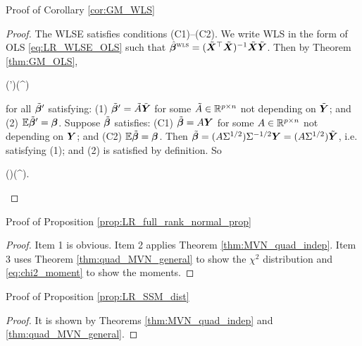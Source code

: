 \documentclass[10pt,a4paper]{book}
\begin{document}
\begin{pfbox}{Proof of Corollary \ref{cor:GM_WLS}}
	\begin{proof}
		The WLSE satisfies conditions (C1)--(C2).
		We write WLS in the form of OLS \eqref{eq:LR_WLSE_OLS} such that $\hat{{\boldsymbol\beta}}^{\textsc{wls}}=(\tilde{{\boldsymbol X}}^\top\tilde{{\boldsymbol X}})^{-1}\tilde{{\boldsymbol X}}\tilde{{\boldsymbol Y}}$. 
		Then by Theorem \ref{thm:GM_OLS}, 
		\begin{sequation*}
			\Cov(\tilde{\bab}')\succeq \Cov(\hat{\bab}^{\WLS})
		\end{sequation*}
		for all $\tilde{{\boldsymbol\beta}}'$ satisfying: (1) $\tilde{{\boldsymbol\beta}}'=\tilde{A}\tilde{{\boldsymbol Y}}$ for some $\tilde{A}\in\mathbb R^{p\times n}$ not depending on $\tilde{{\boldsymbol Y}}$; and (2) $\mathbb E\tilde{{\boldsymbol\beta}}'={\boldsymbol\beta}$.
		Suppose $\tilde{{\boldsymbol\beta}}$ satisfies: (C1) $\tilde{{\boldsymbol\beta}}=A{\boldsymbol Y}$ for some $A\in\mathbb R^{p\times n}$ not depending on ${\boldsymbol Y}$; and (C2) $\mathbb E\tilde{{\boldsymbol\beta}}={\boldsymbol\beta}$.
		Then $\tilde{{\boldsymbol\beta}}=(A\Sigma^{1/2})\Sigma^{-1/2}{\boldsymbol Y}=(A\Sigma^{1/2})\tilde{{\boldsymbol Y}}$, i.e. satisfying (1); and (2) is satisfied by definition. 
		So 
		\begin{sequation*}
			\Cov(\tilde{\bab})\succeq \Cov(\hat{\bab}^{\WLS}).
		\end{sequation*}
	\end{proof}
\end{pfbox}

\begin{pfbox}{Proof of Proposition \ref{prop:LR_full_rank_normal_prop}}
	\begin{proof}
		Item 1 is obvious. Item 2 applies Theorem \ref{thm:MVN_quad_indep}. Item 3 uses Theorem \ref{thm:quad_MVN_general} to show the $\chi^2$ distribution and \eqref{eq:chi2_moment} to show the moments. 
	\end{proof}
\end{pfbox}

\begin{pfbox}{Proof of Proposition \ref{prop:LR_SSM_dist}}
	\begin{proof}
		It is shown by Theorems \ref{thm:MVN_quad_indep} and \ref{thm:quad_MVN_general}.
	\end{proof}
\end{pfbox}
\end{document}
